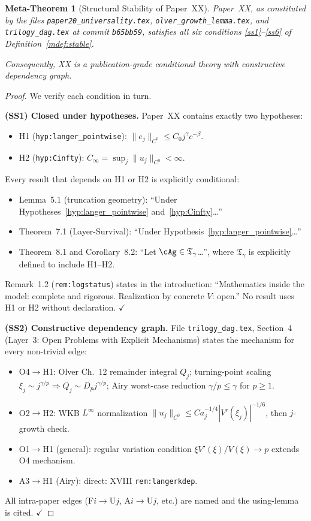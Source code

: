 \documentclass[12pt,a4paper]{amsart}
\newtheorem{metatheorem}{Meta-Theorem}
\theoremstyle{definition}
\begin{document}
\begin{metatheorem}[Structural Stability of Paper~XX]
\label{mthm:stability}
Paper~XX, as constituted by the files
\texttt{paper20\_universality.tex},
\texttt{olver\_growth\_lemma.tex}, and
\texttt{trilogy\_dag.tex}
at commit \texttt{b65bb59},
satisfies all six conditions
\ref{ss1}--\ref{ss6} of
Definition~\ref{mdef:stable}.

Consequently, XX is a
\emph{publication-grade conditional theory with constructive
dependency graph}.
\end{metatheorem}

\begin{proof}
We verify each condition in turn.

\medskip
\textbf{(SS1) Closed under hypotheses.}
Paper~XX contains exactly two hypotheses:
\begin{itemize}[nosep]
  \item H1 (\texttt{hyp:langer\_pointwise}):
    $\|e_j\|_{C^0}\leq C_0 j^\gamma c^{-\beta}$.
  \item H2 (\texttt{hyp:Cinfty}):
    $C_\infty = \sup_j\|u_j\|_{C^0}<\infty$.
\end{itemize}
Every result that depends on H1 or H2 is explicitly conditional:
\begin{itemize}[nosep]
  \item Lemma~5.1 (truncation geometry): ``Under
    Hypotheses~\ref{hyp:langer_pointwise} and~\ref{hyp:Cinfty}\ldots''
  \item Theorem~7.1 (Layer-Survival): ``Under
    Hypothesis~\ref{hyp:langer_pointwise}\ldots''
  \item Theorem~8.1 and Corollary~8.2: ``Let
    $\cAg\in\mathfrak{T}_\gamma$\ldots'', where $\mathfrak{T}_\gamma$
    is explicitly defined to include H1--H2.
\end{itemize}
Remark~1.2 (\texttt{rem:logstatus}) states in the introduction:
``Mathematics inside the model: complete and rigorous.
Realization by concrete $V$: open.''
No result uses H1 or H2 without declaration.
\hfill$\checkmark$

\medskip
\textbf{(SS2) Constructive dependency graph.}
File \texttt{trilogy\_dag.tex}, Section~4
(Layer~3: Open Problems with Explicit Mechanisms)
states the mechanism for every non-trivial edge:
\begin{itemize}[nosep]
  \item O4$\to$H1: Olver Ch.~12 remainder integral $Q_j$;
    turning-point scaling $\xi_j\sim j^{\gamma/p}\Rightarrow
    Q_j\sim D_p j^{\gamma/p}$;
    Airy worst-case reduction $\gamma/p\leq\gamma$
    for $p\geq 1$.
  \item O2$\to$H2: WKB $L^\infty$ normalization
    $\|u_j\|_{C^0}\leq Ca_j^{-1/4}|V'(\xi_j)|^{-1/6}$,
    then $j$-growth check.
  \item O1$\to$H1 (general): regular variation condition
    $\xi V'(\xi)/V(\xi)\to p$ extends O4 mechanism.
  \item A3$\to$H1 (Airy): direct:
    XVIII \texttt{rem:langerkdep}.
\end{itemize}
All intra-paper edges (F$i$$\to$U$j$, A$i$$\to$U$j$, etc.)
are named and the using-lemma is cited.
\hfill$\checkmark$


\end{proof}
\end{document}
